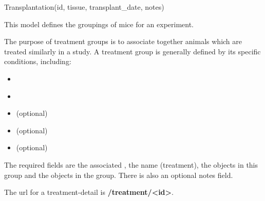 \documentclass[letterpaper,10pt,english]{sphinxmanual}
\begin{document}

\begin{fulllineitems}
\label{data:mousedb.data.models.Transplantation}
Transplantation(id, tissue, transplant\_date, notes)

\end{fulllineitems}


\begin{fulllineitems}
\label{data:mousedb.data.models.Treatment}
This model defines the groupings of mice for an experiment.

The purpose of treatment groups is to associate together animals which are treated similarly in a study.
A treatment group is generally defined by its specific conditions, including:
\begin{itemize}
\item {} 
{\hyperref[data:mousedb.data.models.Diet]{}}

\item {} 
{\hyperref[data:mousedb.data.models.Environment]{}}

\item {} 
{\hyperref[data:mousedb.data.models.Implantation]{}} (optional)

\item {} 
{\hyperref[data:mousedb.data.models.Transplantation]{}} (optional)

\item {} 
{\hyperref[data:mousedb.data.models.Pharmaceutical]{}} (optional)

\end{itemize}

The required fields are the associated {\hyperref[data:mousedb.data.models.Study]{}}, the name (treatment), the  objects in this group and the  {\hyperref[data:mousedb.data.models.Researcher]{}} objects in the group.
There is also an optional notes field.

\begin{fulllineitems}
\label{data:mousedb.data.models.Treatment.get_absolute_url}
The url for a treatment-detail is \textbf{/treatment/\textless{}id\textgreater{}}.

\end{fulllineitems}


\end{fulllineitems}
\end{document}

